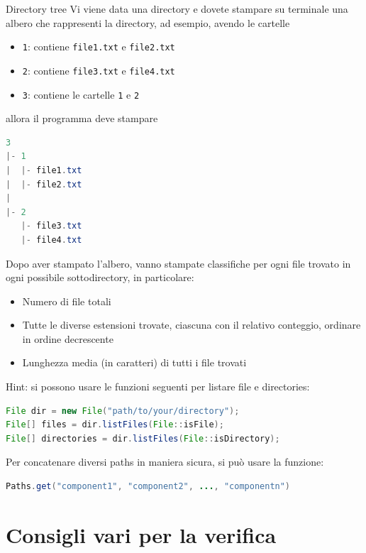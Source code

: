 \begin{esercizio}{Directory tree}
	Vi viene data una directory e dovete stampare su terminale una albero che rappresenti la directory, ad esempio, avendo le cartelle
	\begin{itemize}
		\item \verb|1|: contiene \verb|file1.txt| e \verb|file2.txt|
		\item \verb|2|: contiene \verb|file3.txt| e \verb|file4.txt|
		\item \verb|3|: contiene le cartelle \verb|1| e \verb|2|
	\end{itemize}
	allora il programma deve stampare
	\begin{lstlisting}[language = java, frame = none]
3
|- 1
|  |- file1.txt
|  |- file2.txt
| 
|- 2
   |- file3.txt
   |- file4.txt
  \end{lstlisting}
	Dopo aver stampato l'albero, vanno stampate classifiche per ogni file trovato in ogni possibile sottodirectory, in particolare:
	\begin{itemize}
		\item Numero di file totali
		\item Tutte le diverse estensioni trovate, ciascuna con il relativo conteggio, ordinare in ordine decrescente
		\item Lunghezza media (in caratteri) di tutti i file trovati
	\end{itemize}
	Hint: si possono usare le funzioni seguenti per listare file e directories:
	\begin{lstlisting}[language = java, frame = none]
File dir = new File("path/to/your/directory");
File[] files = dir.listFiles(File::isFile);
File[] directories = dir.listFiles(File::isDirectory);
\end{lstlisting}
	Per concatenare diversi paths in maniera sicura, si può usare la funzione:
	\begin{lstlisting}[language = java, frame = none]
Paths.get("component1", "component2", ..., "componentn")
\end{lstlisting}


\end{esercizio}

\section{Consigli vari per la verifica}
